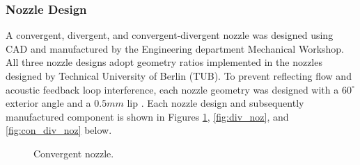 \subsubsection{Nozzle Design}
A convergent, divergent, and convergent-divergent nozzle was designed using CAD and manufactured by the Engineering department Mechanical Workshop. All three nozzle designs adopt geometry ratios implemented in the nozzles designed by Technical University of Berlin (TUB). To prevent reflecting flow and acoustic feedback loop interference, each nozzle geometry was designed with a $60^\circ$ exterior angle and a $0.5mm$ lip \cite{poldervaart1968photographic}. Each nozzle design and subsequently manufactured component is shown in Figures \ref{fig:con_noz}, \ref{fig:div_noz}, and \ref{fig:con_div_noz} below. 
 
\begin{figure}[!tbh]
  \centering
  \hfill
  \caption{Convergent nozzle.}
  \label{fig:con_noz}
\end{figure}

